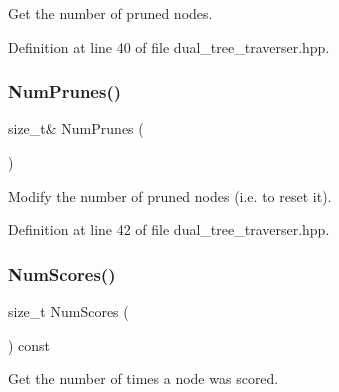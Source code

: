 Get the number of pruned nodes. 



Definition at line 40 of file dual\+\_\+tree\+\_\+traverser.\+hpp.

\mbox{\label{classmlpack_1_1tree_1_1Octree_1_1DualTreeTraverser_adf887190e9d9024ff244503e4aaf0732}} 
\subsubsection{Num\+Prunes()\hspace{0.1cm}{\footnotesize\ttfamily [2/2]}}
{\footnotesize\ttfamily size\+\_\+t\& Num\+Prunes (\begin{DoxyParamCaption}{ }\end{DoxyParamCaption})\hspace{0.3cm}{\ttfamily [inline]}}



Modify the number of pruned nodes (i.\+e. to reset it). 



Definition at line 42 of file dual\+\_\+tree\+\_\+traverser.\+hpp.

\mbox{\label{classmlpack_1_1tree_1_1Octree_1_1DualTreeTraverser_a9adf9744b1b9b4d74e0da6570010e63e}} 
\subsubsection{Num\+Scores()\hspace{0.1cm}{\footnotesize\ttfamily [1/2]}}
{\footnotesize\ttfamily size\+\_\+t Num\+Scores (\begin{DoxyParamCaption}{ }\end{DoxyParamCaption}) const\hspace{0.3cm}{\ttfamily [inline]}}



Get the number of times a node was scored. 



